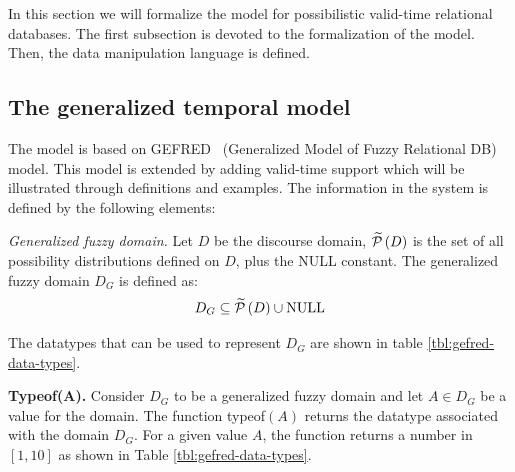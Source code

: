 %
%

In this section we will formalize the model for possibilistic valid-time relational databases. The first subsection is devoted to the formalization of the model. Then, the data manipulation language is defined.

\subsection{\label{subsec:temporal-model}The generalized temporal model}
The model is based on GEFRED~\cite{Medina1994} (Generalized Model of Fuzzy Relational DB) model. This model is extended by adding valid-time support which will be illustrated through definitions and examples. The information in the system is defined by the following elements:

\begin{definition}
\label{def:generalized-fuzzy-domain}
\emph{Generalized fuzzy domain.}
Let $D$ be the discourse domain, $\widetilde {\mathcal{P}}\left(D \right)$ is the set of all possibility distributions defined on $D$, plus the NULL constant. The generalized fuzzy domain $D_G$ is defined as:
\begin{equation}
\label{eq:generalized-fuzzy-domain}
D_G \subseteq \widetilde {\mathcal{P}}\left(D \right)\cup \text{NULL}
\end{equation}
\end{definition}
The datatypes that can be used to represent $D_G$ are shown in table \ref{tbl:gefred-data-types}. 

\begin{definition}
\label{def:typeof-domain}
\textbf{Typeof(A).}
Consider $D_G$ to be a generalized fuzzy domain and let $A \in D_G$ be a value for the domain. 
The function typeof$\left(A \right)$ returns the datatype associated with the domain $D_G$. For a given value $A$, the function returns a number in $\left[1, 10 \right]$ as shown in Table \ref{tbl:gefred-data-types}.
\end{definition}


